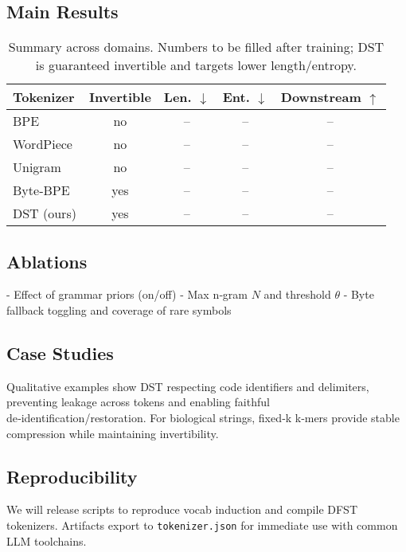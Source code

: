 \subsection{Main Results}

\begin{table}[h]
  \centering
  \small
  \begin{tabular}{lcccc}
    \toprule
    Tokenizer & Invertible & Len. $\downarrow$ & Ent. $\downarrow$ & Downstream $\uparrow$ \\
    \midrule
    BPE &  \;no &  -- & -- & -- \\
    WordPiece & \;no & -- & -- & -- \\
    Unigram & \;no & -- & -- & -- \\
    Byte‑BPE &  yes & -- & -- & -- \\
    DST (ours) &  yes & -- & -- & -- \\
    \bottomrule
  \end{tabular}
  \caption{Summary across domains. Numbers to be filled after training; DST is guaranteed invertible and targets lower length/entropy.}
  \label{tab:main}
\end{table}

\subsection{Ablations}

- Effect of grammar priors (on/off)
- Max n‑gram $N$ and threshold $\theta$
- Byte fallback toggling and coverage of rare symbols

\subsection{Case Studies}

Qualitative examples show DST respecting code identifiers and delimiters, preventing leakage across tokens and enabling faithful de‑identification/restoration. For biological strings, fixed‑k k‑mers provide stable compression while maintaining invertibility.

\subsection{Reproducibility}

We will release scripts to reproduce vocab induction and compile DFST tokenizers. Artifacts export to \texttt{tokenizer.json} for immediate use with common LLM toolchains.
